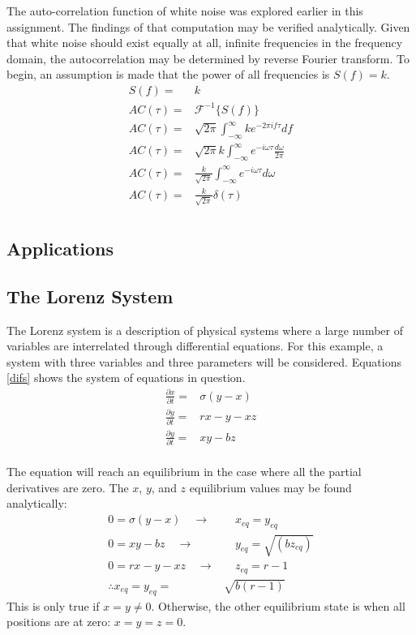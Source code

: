 \documentclass[twocolumn]{article}
\begin{document}
The auto-correlation function of white noise was explored earlier in this assignment. The findings of that computation may be verified analytically. Given that white noise should exist equally at all, infinite frequencies in the frequency domain, the autocorrelation may be determined by reverse Fourier transform. To begin, an assumption is made that the power of all frequencies is $S(f) = k$.
\begin{equation}
\begin{split}
S(f) =& k \\
AC(\tau) =& \mathcal{F}^{-1} \{ S(f) \} \\
AC(\tau) =& \sqrt{2\pi} \int_{-\infty}^{\infty} k e^{-2\pi i f \tau} df \\
AC(\tau) =& \sqrt{2\pi}k \int_{-\infty}^{\infty} e^{- i \omega \tau} \frac{d\omega}{2\pi} \\
AC(\tau) =& \frac{k}{\sqrt{2\pi}} \int_{-\infty}^{\infty} e^{- i \omega \tau} d\omega \\
AC(\tau) =& \frac{k}{\sqrt{2\pi}} \delta(\tau) \\
\end{split}
\end{equation}
\subsection{Applications}
\subsection{The Lorenz System}
The Lorenz system is a description of physical systems where a large number of variables are interrelated through differential equations. For this example, a system with three variables and three parameters will be considered. Equations \ref{difs} shows the system of equations in question.
\begin{equation} \label{difs}
	\begin{split}
		\frac{\partial x}{\partial t} =& \sigma (y - x) \\
		\frac{\partial y}{\partial t} =& rx - y - xz \\
		\frac{\partial y}{\partial t} =& xy - bz \\
	\end{split}
\end{equation}

The equation will reach an equilibrium in the case where all the partial derivatives are zero. The $x$, $y$, and $z$ equilibrium values may be found analytically:
\begin{equation} \label{equilibrium}
	\begin{split}
		0 = \sigma (y - x) \quad \to  & \quad x_{eq} = y_{eq}\\
		0 = xy - bz \quad \to & \quad y_{eq} = \sqrt{(bz_{eq})}\\
		0 = rx - y - xz \quad \to & \quad z_{eq} = r-1\\
		\therefore x_{eq} = y_{eq} =& \sqrt{b(r-1)}
	\end{split}
\end{equation}
This is only true if $x = y \neq 0$. Otherwise, the other equilibrium state is
when all positions are at zero: $x = y = z = 0$.
\end{document}
